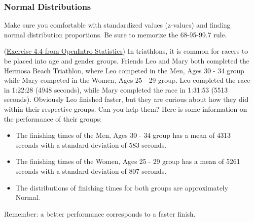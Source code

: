 \documentclass[12pt,answers]{exam}
\newcounter{countA}
\begin{document}
\subsubsection*{Normal Distributions}

Make sure you comfortable with standardized values (z-values) and finding normal distribution proportions. Be sure to memorize the 68-95-99.7 rule.

\begin{questions}
\setcounter{question}{\value{countA}}

\question (\href{http://people.hsc.edu/faculty-staff/blins/books/OpenIntroStats4e.pdf\#eoce.4.4}{Exercise 4.4 from OpenIntro Statistics}) 
In triathlons, it is common for racers to be placed into age and gender groups.
Friends Leo and Mary both completed the Hermosa Beach Triathlon, where Leo competed in the Men, Ages
30 - 34 group while Mary competed in the Women, Ages 25 - 29 group. Leo completed the race in 1:22:28
(4948 seconds), while Mary completed the race in 1:31:53 (5513 seconds). Obviously Leo finished faster,
but they are curious about how they did within their respective groups. Can you help them? Here is some
information on the performance of their groups:
\begin{itemize}
\item The finishing times of the Men, Ages 30 - 34 group has a mean of 4313 seconds with a standard
deviation of 583 seconds.
\item The finishing times of the Women, Ages 25 - 29 group has a mean of 5261 seconds with a standard
deviation of 807 seconds.
\item The distributions of finishing times for both groups are approximately Normal.
\end{itemize}
Remember: a better performance corresponds to a faster finish.
\bigskip

\end{questions}
\end{document}
